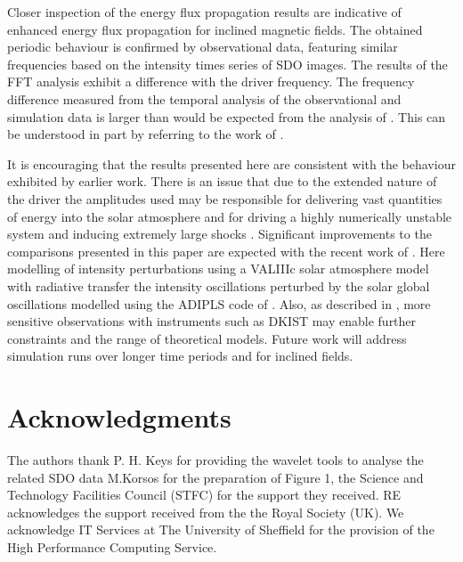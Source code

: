 \documentclass[linenumbers]{aastex63}
\begin{document}
 Closer inspection of the energy flux propagation results are indicative of enhanced energy flux propagation for inclined magnetic fields. The obtained periodic behaviour is confirmed by observational data, featuring similar frequencies based on the intensity times series of SDO images. The results of the FFT analysis exhibit a difference with the driver frequency. The frequency difference measured from the temporal analysis of the observational and simulation data is larger than would be expected from the analysis of \citet{Hindman1996}. This can be understood in part by referring to the work of \citet{Campbell1989}.


It is encouraging that the results presented here are consistent with the behaviour exhibited  by earlier work. There is an issue that due to the extended nature of the driver the amplitudes used may be responsible for delivering vast quantities of energy into the solar atmosphere and for driving a highly numerically unstable system and inducing extremely large shocks \citet{Santamaria2015}. Significant improvements to the comparisons presented in this paper are expected with the  recent work of \citet{Kostogryz2021}. Here modelling of intensity perturbations using a VALIIIc solar atmosphere model with radiative transfer the intensity oscillations perturbed by the solar global oscillations modelled using the ADIPLS code of \citet{Christensen-Dalsgaard2008}. Also, as described in \citet{Rast2016}, more sensitive observations with instruments such as DKIST may enable further constraints and the range of theoretical models. Future work will address simulation runs over longer time periods and for inclined fields.  


\section{Acknowledgments}

The authors thank P. H. Keys for providing the wavelet tools to analyse the related SDO data M.Korsos for the preparation of Figure 1, the Science and Technology Facilities Council (STFC) for the support they received.  RE acknowledges the support received from the the Royal Society (UK). We acknowledge IT Services at The University of Sheffield for the provision of the High Performance Computing Service.
\end{document}
